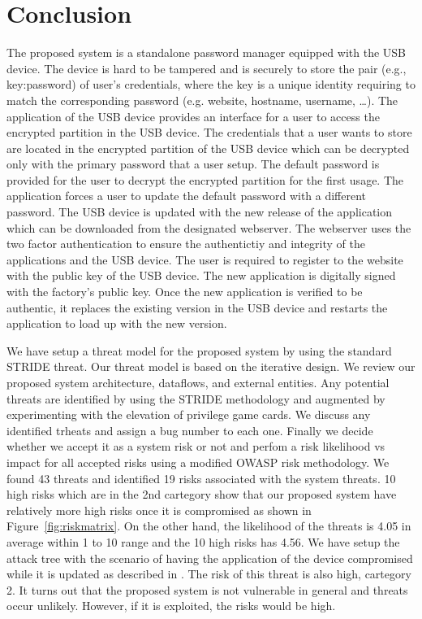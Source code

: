 \chapter{Conclusion}
\label{ch:conclusion}
The proposed system is a standalone password manager equipped with the
USB device. The device is hard to be tampered and is securely to store
the pair (e.g., key:password) of user's credentials, where the key is
a unique identity requiring to match the corresponding password
(e.g. website, hostname, username, \dots). The application of the USB
device provides an interface for a user to access the encrypted
partition in the USB device.  The credentials that a user wants to
store are located in the encrypted partition of the USB device which
can be decrypted only with the primary password that a user setup.
The default password is provided for the user to decrypt the encrypted
partition for the first usage. The application forces a user to update
the default password with a different password.  The USB device is
updated with the new release of the application which can be
downloaded from the designated webserver. The webserver uses the two
factor authentication to ensure the authentictiy and integrity of the
applications and the USB device. The user is required to register to
the website with the public key of the USB device.  The new
application is digitally signed with the factory's public key. Once
the new application is verified to be authentic, it replaces the
existing version in the USB device and restarts the application to
load up with the new version.

We have setup a threat model for the proposed system by using the
standard STRIDE threat.  Our threat model is based on the iterative
design. We review our proposed system architecture, dataflows, and
external entities. Any potential threats are identified by using the
STRIDE methodology and augmented by experimenting with the elevation
of privilege game cards.  We discuss any identified trheats and assign
a bug number to each one. Finally we decide whether we accept it as a
system risk or not and perfom a risk likelihood vs impact for all
accepted risks using a modified OWASP risk methodology.  We found 43
threats and identified 19 risks associated with the system threats. 10
high risks which are in the 2nd cartegory show that our proposed
system have relatively more high risks once it is compromised as shown
in Figure~\ref{fig:riskmatrix}. On the other hand, the likelihood of
the threats is 4.05 in average within 1 to 10 range and the 10 high
risks has 4.56. We have setup the attack tree with the scenario of
having the application of the device compromised while it is updated
as described in . The risk of this threat is also high,
cartegory 2. It turns out that the proposed system is not vulnerable
in general and threats occur unlikely. However, if it is exploited,
the risks would be high.

